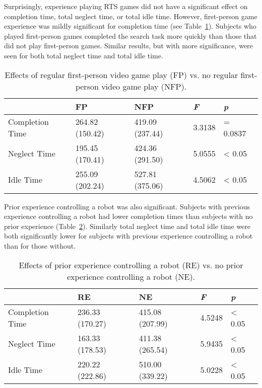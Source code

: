 Surprisingly, experience playing RTS games did not have a significant effect on completion time, total neglect time, or total idle time. However, first-person game experience was mildly significant for completion time (see Table~\ref{tab:prior-fp}). Subjects who played first-person games completed the search task more quickly than those that did not play first-person games. Similar results, but with more significance, were seen for both total neglect time and total idle time.


\begin{table}[ht]
\label{tab:prior-fp}
\begin{center}
	\begin{tabular}{| l | l | l | l | l |}
	\hline
		& \textbf{FP} & \textbf{NFP} & \emph{F} & \emph{p}\\ \hline
		Completion Time & 264.82 (150.42) & 419.09 (237.44) & 3.3138 & = 0.0837\\ \hline
		Neglect Time & 195.45 (170.41) & 424.36 (291.50) & 5.0555 & < 0.05\\ \hline
		Idle Time & 255.09 (202.24) & 527.81 (375.06) & 4.5062 & < 0.05\\ \hline
	\hline
	\end{tabular}
	\caption{Effects of regular first-person video game play (FP) vs. no regular first-person video game play (NFP).}
\end{center}
\end{table}


Prior experience controlling a robot was also significant. Subjects with previous experience controlling a robot had lower completion times than subjects with no prior experience (Table~\ref{tab:prior-robot}). Similarly total neglect time and total idle time were both significantly lower for subjects with previous experience controlling a robot than for those without.


\begin{table}[ht]
\label{tab:prior-robot}
\begin{center}
	\begin{tabular}{| l | l | l | l | l |}
	\hline
		& \textbf{RE} & \textbf{NE} & \emph{F} & \emph{p}\\ \hline
		Completion Time & 236.33 (170.27) & 415.08 (207.99) & 4.5248 & < 0.05\\ \hline
		Neglect Time & 163.33 (178.53) & 411.38 (265.54) & 5.9435 & < 0.05\\ \hline
		Idle Time & 220.22 (222.86) & 510.00 (339.22) & 5.0228 & < 0.05\\ \hline
	\hline
	\end{tabular}
	\caption{Effects of prior experience controlling a robot (RE) vs. no prior experience controlling a robot (NE).}
\end{center}
\end{table}


